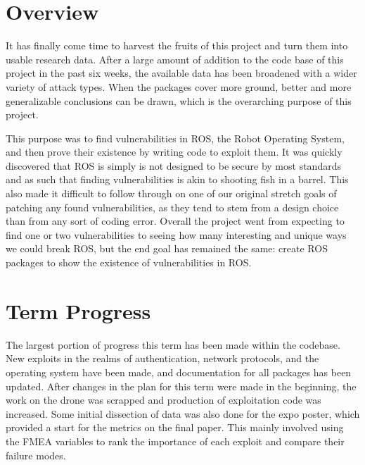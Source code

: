 \documentclass[IEEEtran,letterpaper,10pt,notitlepage,draftclsnofoot,onecolumn]{article}
\begin{document}
\newpage
{}
\tableofcontents
\clearpage

\section{Overview}
It has finally come time to harvest the fruits of this project and turn them into usable research data.
After a large amount of addition to the code base of this project in the past six weeks, the available data has been broadened with a wider variety of attack types.
When the packages cover more ground, better and more generalizable conclusions can be drawn, which is the overarching purpose of this project.

This purpose was to find vulnerabilities in ROS, the Robot Operating System, and then prove their existence by writing code to exploit them. 
It was quickly discovered that ROS is simply is not designed to be secure by most standards and as such that finding vulnerabilities is akin to shooting fish in a barrel. 
This also made it difficult to follow through on one of our original stretch goals of patching any found vulnerabilities, as they tend to stem from a design choice than from any sort of coding error. 
Overall the project went from expecting to find one or two vulnerabilities to seeing how many interesting and unique ways we could break ROS, but the end goal has remained the same: create ROS packages to show the existence of vulnerabilities in ROS. 


\section{Term Progress}
The largest portion of progress this term has been made within the codebase.
New exploits in the realms of authentication, network protocols, and the operating system have been made, and documentation for all packages has been updated.
After changes in the plan for this term were made in the beginning, the work on the drone was scrapped and production of exploitation code was increased.
Some initial dissection of data was also done for the expo poster, which provided a start for the metrics on the final paper.
This mainly involved using the FMEA variables to rank the importance of each exploit and compare their failure modes.
\end{document}
